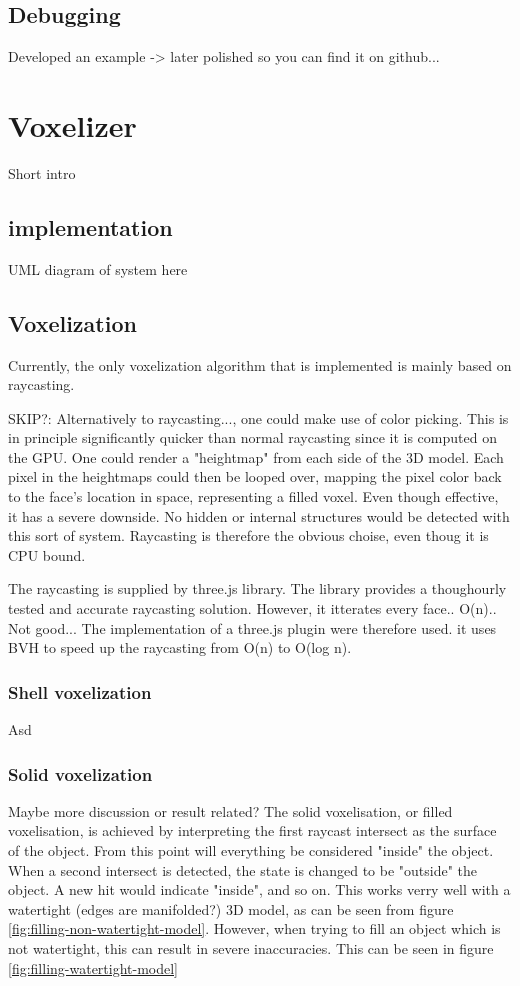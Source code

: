 \subsection{Debugging}
Developed an example -> later polished so you can find it on github...

\section{Voxelizer}
Short intro
\subsection{implementation}
\colorbox{RubineRed}{UML diagram of system here}

\subsection{Voxelization}
Currently, the only voxelization algorithm that is implemented is mainly based on raycasting.

\colorbox{RubineRed}{SKIP?:
Alternatively to raycasting}..., one could make use of color picking. This is in principle significantly quicker than normal raycasting since it is computed on the GPU. One could render a "heightmap" from each side of the 3D model. Each pixel in the heightmaps could then be looped over, mapping the pixel color back to the face's location in space, representing a filled voxel. Even though effective, it has a severe downside. No hidden or internal structures would be detected with this sort of system. Raycasting is therefore the obvious choise, even thoug it is CPU bound.


The raycasting is supplied by three.js library. The library provides a thoughourly tested and accurate raycasting solution. However, it itterates every face.. O(n).. Not good... The implementation of a three.js plugin were therefore used. it uses BVH to speed up the raycasting from O(n) to O(log n).

\subsubsection{Shell voxelization}
Asd

\subsubsection{Solid voxelization}
\colorbox{RubineRed}{Maybe more discussion or result related?}
The solid voxelisation, or filled voxelisation, is achieved by interpreting the first raycast intersect as the surface of the object. From this point will everything be considered "inside" the object. When a second intersect is detected, the state is changed to be "outside" the object. A new hit would indicate "inside", and so on. This works verry well with a watertight (\colorbox{RubineRed}{edges are manifolded?}) 3D model, as can be seen from figure \ref{fig:filling-non-watertight-model}. However, when trying to fill an object which is not watertight, this can result in severe inaccuracies. This can be seen in figure \ref{fig:filling-watertight-model}

